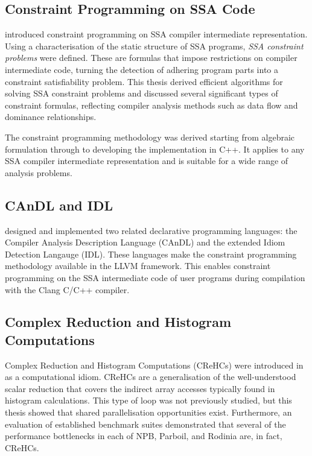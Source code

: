 \subsection*{Constraint Programming on SSA Code}

     introduced constraint programming on
    SSA compiler intermediate representation.
    Using a characterisation of the static structure of SSA programs,
    {\it SSA constraint problems} were defined.
    These are formulas that impose restrictions on compiler intermediate code,
    turning the detection of adhering program parts into a constraint
    satisfiability problem.
    This thesis derived efficient algorithms for solving SSA constraint problems
    and discussed several significant types of constraint formulas, reflecting
    compiler analysis methods such as data flow and dominance relationships.

    The constraint programming methodology was derived starting from algebraic
    formulation through to developing the implementation in C++.
    It applies to any SSA compiler intermediate representation and is suitable
    for a wide range of analysis problems.

\subsection*{CAnDL and IDL}

     designed and implemented two
    related declarative programming languages: the Compiler Analysis
    Description Language (CAnDL) and the extended Idiom Detection Langauge
    (IDL).
    These languages make the constraint programming methodology available in the
    LLVM framework.
    This enables constraint programming on the SSA intermediate code of user
    programs during compilation with the Clang C/C++ compiler.

\subsection*{Complex Reduction and Histogram Computations}

    Complex Reduction and Histogram Computations (CReHCs) were introduced in
     as a computational idiom.
    CReHCs are a generalisation of the well-understood scalar reduction that
    covers the indirect array accesses typically found in histogram
    calculations.
    This type of loop was not previously studied, but this thesis showed that
    shared parallelisation opportunities exist.
    Furthermore, an evaluation of established benchmark suites demonstrated
    that several of the performance bottlenecks in each of NPB, Parboil, and
    Rodinia are, in fact,  CReHCs.

